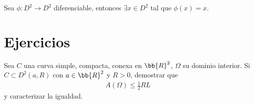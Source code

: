 \begin{teo}
    Sea $\phi: D^2 \to D^2$ diferenciable, entonces $\exists x\in D^2$ tal que $\phi(x)=x$.
\end{teo}

\section{Ejercicios}

\begin{ejercicio}
    Sea $C$ una curva simple, compacta, conexa en $\bb{R}^2$, $\Omega$ su dominio interior. Si $C\subset D^2(a,R)$ con $a\in \bb{R}^2$ y $R>0$, demostrar que 
    \begin{gather*}
        A(\Omega) \leq \frac{1}{2} RL
    \end{gather*}
    y caracterizar la igualdad.
\end{ejercicio}
